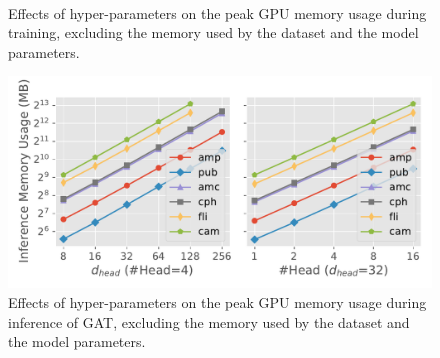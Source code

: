 \begin{figure}[H]
    \centering
    \\
    \caption{Effects of hyper-parameters on the peak GPU memory usage during training, excluding the memory used by the dataset and the model parameters.}
    \label{fig:exp_hyperparameter_memory_usage}
\end{figure}

\begin{figure}[h]
    \centering
    \includegraphics[width=0.5\columnwidth]{figs/experiments/exp_hyperparameter_on_inference_memory_usage_gat.pdf}
    \caption{Effects of hyper-parameters on the peak GPU memory usage during inference of GAT, excluding the memory used by the dataset and the model parameters.}
    \label{fig:exp_inference_hyperparameter_memory_usage_gat}
\end{figure}

